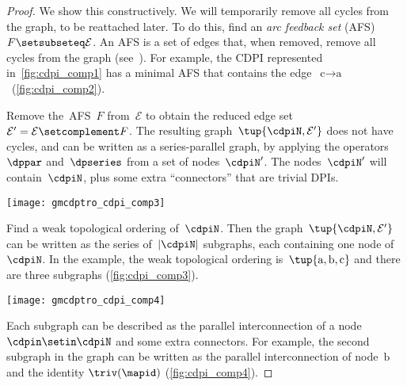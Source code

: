 \begin{proof}
    We show this constructively.
    We will temporarily remove all cycles from the graph, to be reattached later.
    To do this, find an \emph{arc feedback set} (AFS) $F\setsubseteq\mathcal{E}$.
    An AFS is a set of edges that, when removed, remove all cycles from the graph (see~\cite{golovach15incremental}).
    For example, the CDPI represented in~\cref{fig:cdpi_comp1} has a minimal AFS that contains the edge~$\text{c}\rightarrow\text{a}$~(\cref{fig:cdpi_comp2}).

    Remove the~AFS~$F$ from~$\mathcal{E}$ to obtain the reduced edge set~$\mathcal{E}'=\mathcal{E}\setcomplement F$.
    The resulting graph~$\tup{\cdpiN,\mathcal{E}'} $ does not have cycles, and can be written as a series-parallel graph, by applying the operators~$\dppar$ and~$\dpseries$ from a set of nodes~$\cdpiN'$.
    The nodes~$\cdpiN'$ will contain~$\cdpiN$, plus some extra ``connectors'' that are trivial DPIs.

    \begin{marginfigure}
        \texttt{[image: gmcdptro\_cdpi\_comp3]}
        \caption{}
        \label{fig:cdpi_comp3}
    \end{marginfigure}

    Find a weak topological ordering of~$\cdpiN$.
    Then the graph~$\tup{\cdpiN,\mathcal{E}'} $ can be written as the series of~$|\cdpiN|$ subgraphs, each containing one node of~$\cdpiN$.
    In the example, the weak topological ordering is~$\tup{\text{a},\text{b},\text{c}} $ and there are three subgraphs (\cref{fig:cdpi_comp3}).

    \begin{marginfigure}
        \texttt{[image: gmcdptro\_cdpi\_comp4]}
        \caption{}
        \label{fig:cdpi_comp4}
    \end{marginfigure}

    Each subgraph can be described as the parallel interconnection of a node~$\cdpin\setin\cdpiN$ and some extra connectors.
    For example, the second subgraph in the graph can be written as the parallel interconnection of node~$\text{b}$ and the identity $\triv(\mapid)$ (\cref{fig:cdpi_comp4}).


\end{proof}
